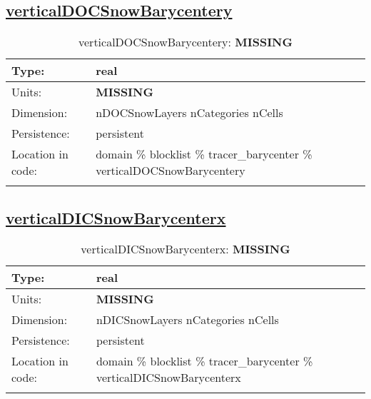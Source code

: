 \subsection[verticalDOCSnowBarycentery]{\hyperref[sec:var_tab_tracer_barycenter]{verticalDOCSnowBarycentery}}
\label{subsec:var_sec_tracer_barycenter_verticalDOCSnowBarycentery}
\begin{center}
\begin{longtable}{| p{2.0in} | p{4.0in} |}
        \hline 
        Type: & real \\
        \hline 
        Units: & {\bf \color{red} MISSING} \\
        \hline 
        Dimension: & nDOCSnowLayers nCategories nCells \\
        \hline 
        Persistence: & persistent \\
        \hline 
         Location in code: & domain \% blocklist \% tracer\_barycenter \% verticalDOCSnowBarycentery \\
         \hline 
    \caption{verticalDOCSnowBarycentery: {\bf \color{red} MISSING}}
\end{longtable}
\end{center}
\subsection[verticalDICSnowBarycenterx]{\hyperref[sec:var_tab_tracer_barycenter]{verticalDICSnowBarycenterx}}
\label{subsec:var_sec_tracer_barycenter_verticalDICSnowBarycenterx}
\begin{center}
\begin{longtable}{| p{2.0in} | p{4.0in} |}
        \hline 
        Type: & real \\
        \hline 
        Units: & {\bf \color{red} MISSING} \\
        \hline 
        Dimension: & nDICSnowLayers nCategories nCells \\
        \hline 
        Persistence: & persistent \\
        \hline 
         Location in code: & domain \% blocklist \% tracer\_barycenter \% verticalDICSnowBarycenterx \\
         \hline 
    \caption{verticalDICSnowBarycenterx: {\bf \color{red} MISSING}}
\end{longtable}
\end{center}
